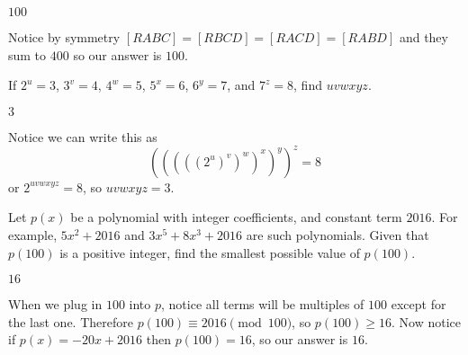 \documentclass[11pt]{article}
\begin{document}
\begin{answer}
$\boxed{100}$
\end{answer}

\begin{solution}
Notice by symmetry $[RABC] = [RBCD] = [RACD] = [RABD]$ and they sum to $400$ so our answer is $\boxed{100}$.
\end{solution}


\begin{problem}
If $2^u = 3$, $3^v = 4$, $4^w = 5$, $5^x = 6$, $6^y = 7$, and $7^z = 8$, find $uvwxyz$.
\end{problem}

\begin{answer}
$\boxed{3}$
\end{answer}

\begin{solution}
Notice we can write this as \[ (((((2^u)^v)^w)^x)^y)^z = 8 \] or $2^{uvwxyz} = 8$, so $uvwxyz = \boxed{3}$.
\end{solution}


\begin{problem}
Let $p(x)$ be a polynomial with integer coefficients, and constant term $2016$. For example, $5x^2 + 2016$ and $3x^5 + 8x^3 + 2016$ are such polynomials. Given that $p(100)$ is a positive integer, find the smallest possible value of $p(100)$. 
\end{problem}

\begin{answer}
$\boxed{16}$
\end{answer}

\begin{solution}
When we plug in $100$ into $p$, notice all terms will be multiples of $100$ except for the last one. Therefore $p(100) \equiv 2016 \pmod{100}$, so $p(100) \ge 16$. Now notice if $p(x) = -20x+2016$ then $p(100) = 16$, so our answer is $\boxed{16}$.
\end{solution}
\end{document}
